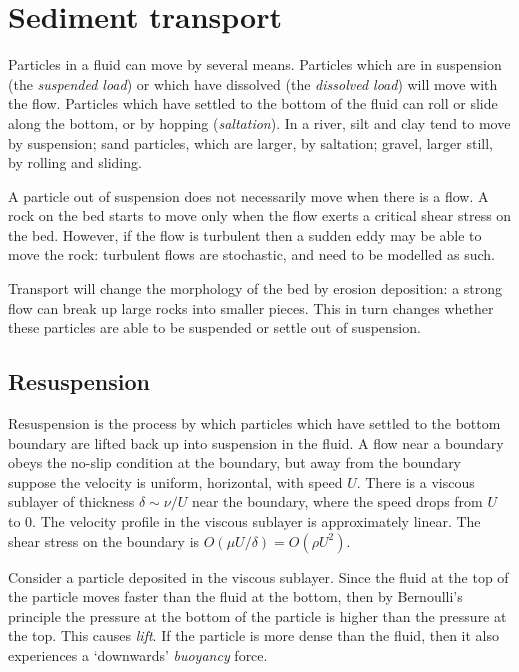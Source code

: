 \section{Sediment transport}

Particles in a fluid can move by several means. Particles which are in
suspension (the \textit{suspended load}) or which have dissolved (the
\textit{dissolved load}) will move with the flow. Particles which have settled
to the bottom of the fluid can roll or slide along the bottom, or by hopping
(\textit{saltation}). In a river, silt and clay tend to move by suspension; sand
particles, which are larger, by saltation; gravel, larger still, by rolling and
sliding. 

A particle out of suspension does not necessarily move when there is a flow. A
rock on the bed starts to move only when the flow exerts a critical shear stress
on the bed. However, if the flow is turbulent then a sudden eddy may be able to
move the rock: turbulent flows are stochastic, and need to be modelled as such. 

Transport will change the morphology of the bed by erosion deposition: a strong
flow can break up large rocks into smaller pieces. This in turn changes whether
these particles are able to be suspended or settle out of suspension.  

\subsection{Resuspension}

Resuspension is the process by which particles which have settled to the bottom
boundary are lifted back up into suspension in the fluid. A flow near a boundary
obeys the no-slip condition at the boundary, but away from the boundary suppose
the velocity is uniform, horizontal, with speed $U$. There is a viscous sublayer
of thickness $\delta\sim\nu/U$ near the boundary, where the speed drops from $U$
to $0$. The velocity profile in the viscous sublayer is approximately linear.
The shear stress on the boundary is $O(\mu U/\delta) = O(\rho U^2)$.

Consider a particle deposited in the viscous sublayer. Since the fluid at the
top of the particle moves faster than the fluid at the bottom, then by
Bernoulli's principle the pressure at the bottom of the particle is higher than
the pressure at the top. This causes \textit{lift}. If the particle is more
dense than the fluid, then it also experiences a `downwards' \textit{buoyancy}
force. 

